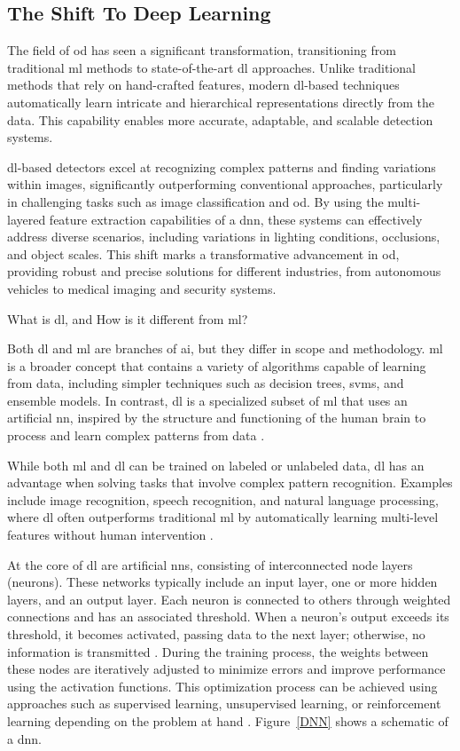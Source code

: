 \subsection{The Shift To Deep Learning}
The field of \gls{od} has seen a significant transformation, transitioning from traditional \gls{ml} methods to state-of-the-art \gls{dl} approaches. Unlike traditional methods that rely on hand-crafted features, modern \gls{dl}-based techniques automatically learn intricate and hierarchical representations directly from the data. This capability enables more accurate, adaptable, and scalable detection systems.  

\gls{dl}-based detectors excel at recognizing complex patterns and finding variations within images, significantly outperforming conventional approaches, particularly in challenging tasks such as image classification and \gls{od}. By using the multi-layered feature extraction capabilities of a \gls{dnn}, these systems can effectively address diverse scenarios, including variations in lighting conditions, occlusions, and object scales. This shift marks a transformative advancement in \gls{od}, providing robust and precise solutions for different industries, from autonomous vehicles to medical imaging and security systems.  

What is \gls{dl}, and How is it different from \gls{ml}? 

Both \gls{dl} and \gls{ml} are branches of \gls{ai}, but they differ in scope and methodology. \gls{ml} is a broader concept that contains a variety of algorithms capable of learning from data, including simpler techniques such as decision trees, \gls{svm}s, and ensemble models. In contrast, \gls{dl} is a specialized subset of \gls{ml} that uses an artificial \gls{nn}, inspired by the structure and functioning of the human brain to process and learn complex patterns from data  \cite{DL_VS_ML} \cite{oD_Review}.

While both \gls{ml} and \gls{dl} can be trained on labeled or unlabeled data, \gls{dl} has an advantage when solving tasks that involve complex pattern recognition. Examples include image recognition, speech recognition, and natural language processing, where \gls{dl} often outperforms traditional \gls{ml} by automatically learning multi-level features without human intervention  \cite{DL_VS_ML} \cite{oD_Review}.  

At the core of \gls{dl} are artificial \gls{nn}s, consisting of interconnected node layers (neurons). These networks typically include an input layer, one or more hidden layers, and an output layer. Each neuron is connected to others through weighted connections and has an associated threshold. When a neuron's output exceeds its threshold, it becomes activated, passing data to the next layer; otherwise, no information is transmitted \cite{ibm_cnn}. During the training process, the weights between these nodes are iteratively adjusted to minimize errors and improve performance using the activation functions. This optimization process can be achieved using approaches such as supervised learning, unsupervised learning, or reinforcement learning depending on the problem at hand  \cite{DL_VS_ML} \cite{oD_Review}. Figure~\ref{DNN} shows a schematic of a \gls{dnn}. 

